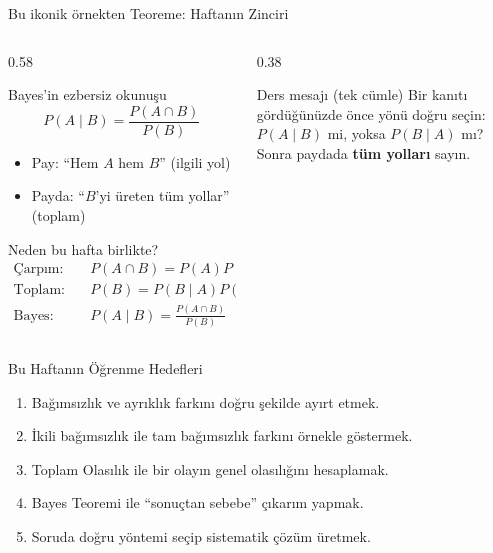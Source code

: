 \documentclass[light]{lutbeamer}
\begin{document}
\begin{frame}{Bu ikonik örnekten Teoreme: Haftanın Zinciri}
    \footnotesize
    \begin{columns}[T]
        \begin{column}{0.58\textwidth}
            \begin{block}{Bayes'in ezbersiz okunuşu}
                \[
                P(A\mid B)=\frac{P(A\cap B)}{P(B)}
                \]
                \begin{itemize}
                    \item Pay: ``Hem $A$ hem $B$'' (ilgili yol)
                    \item Payda: ``$B$'yi üreten tüm yollar'' (toplam)
                \end{itemize}
            \end{block}

            \begin{block}{Neden bu hafta birlikte?}
                \[
                \begin{aligned}
                    \text{Çarpım:}\quad & P(A\cap B)=P(A)P(B\mid A) \\
                    \text{Toplam:}\quad & P(B)=P(B\mid A)P(A)+P(B\mid A')P(A') \\
                    \text{Bayes:}\quad & P(A\mid B)=\frac{P(A\cap B)}{P(B)}
                \end{aligned}
                \]
            \end{block}
        \end{column}

        \begin{column}{0.38\textwidth}
            \begin{alertblock}{Ders mesajı (tek cümle)}
                Bir kanıtı gördüğünüzde önce yönü doğru seçin: \\
                \(P(A\mid B)\) mi, yoksa \(P(B\mid A)\) mı?
                Sonra paydada \textbf{tüm yolları} sayın.
            \end{alertblock}

        \end{column}
    \end{columns}
\end{frame}

\begin{frame}{Bu Haftanın Öğrenme Hedefleri}
    \begin{enumerate}
        \item Bağımsızlık ve ayrıklık farkını doğru şekilde ayırt etmek.
        \item İkili bağımsızlık ile tam bağımsızlık farkını örnekle göstermek.
        \item Toplam Olasılık ile bir olayın genel olasılığını hesaplamak.
        \item Bayes Teoremi ile ``sonuçtan sebebe'' çıkarım yapmak.
        \item Soruda doğru yöntemi seçip sistematik çözüm üretmek.
    \end{enumerate}
\end{frame}
\end{document}
